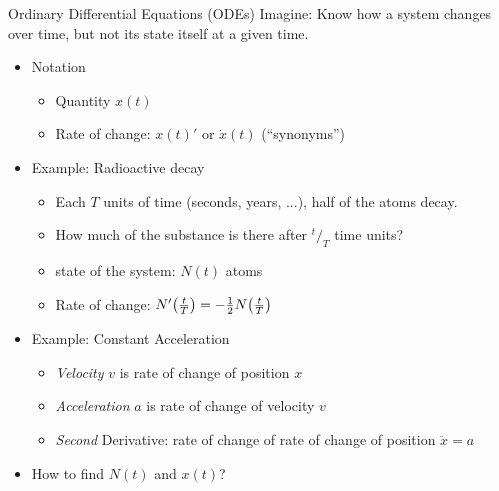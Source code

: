 
\begin{frame}{Ordinary Differential Equations (ODEs)}
%
Imagine: Know how a system changes over time, but not its state itself at a given time.
\begin{itemize}
\item Notation
	\begin{itemize}
	\item Quantity $x(t)$
	\item Rate of change: $x(t)'$ or $\dot{x}(t)$ (\enquote{synonyms})
	\end{itemize}
\item Example: Radioactive decay
	\begin{itemize}
	\item Each $T$ units of time (seconds, years, ...), half of the atoms decay.
	\item[\Thus] How much of the substance is there after ${}^{t}/_T$ time units?
	\item state of the system: $N(t)$ atoms
	\item Rate of change: $N'\qty(\frac{t}{T}) = -\frac{1}{2} N\qty(\frac{t}{T})$
	\end{itemize}
\item Example: Constant Acceleration
	\begin{itemize}
	\item \emph{Velocity} $v$ is rate of change of position $x$
	\item \emph{Acceleration} $a$ is rate of change of velocity $v$
	\item \emph{Second} Derivative: rate of change of rate of change of position $\ddot{x} = a$
	\end{itemize}
\item[\Thus] How to find $N(t)$ and $x(t)$?
\end{itemize}
%
\end{frame}



